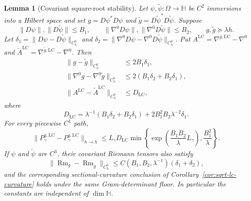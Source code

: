 \documentclass[11pt]{article}
\newtheorem{lemma}[theorem]{Lemma}
\theoremstyle{definition}
\theoremstyle{remark}
\newcommand{\LC}{\mathrm{LC}}
\begin{document}
\begin{lemma}[Covariant square-root stability]\label{lem:manifold-sqrt-stability}
Let $\psi,\widetilde\psi:\Omega\to\mathbb H$ be $C^2$ immersions into a
Hilbert space and set $g=D\psi^*D\psi$ and
$\widetilde g=D\widetilde\psi^*D\widetilde\psi$. Suppose
\begin{equation}
  \|D\psi\|,\|D\widetilde\psi\|\le B_1,\qquad
  \|\nabla^0D\psi\|,\|\nabla^0D\widetilde\psi\|\le B_2,\qquad
  g,\widetilde g\succeq\lambda h.
\end{equation}
Let $\delta_1=\|D\psi-D\widetilde\psi\|_{C^0_h}$ and
$\delta_2=\|\nabla^0D\psi-\nabla^0D\widetilde\psi\|_{C^0_h}$. Put
$A^\LC=\nabla^{g,\LC}-\nabla^0$ and
$\widetilde A^\LC=\nabla^{\widetilde g,\LC}-\nabla^0$. Then
\begin{align}
  \|g-\widetilde g\|_{C^0_h}
  &\le2B_1\delta_1,\\
  \|\nabla^0g-\nabla^0\widetilde g\|_{C^0_h}
  &\le2(B_1\delta_2+B_2\delta_1),\\
  \|A^\LC-\widetilde A^\LC\|_{C^0_h}
  &\le D_{\LC},
\end{align}
where
\begin{equation}
  D_{\LC}=\lambda^{-1}(B_1\delta_2+B_2\delta_1)
       +2B_1^2B_2\lambda^{-2}\delta_1.
\end{equation}
For every piecewise $C^1$ path,
\begin{equation}
  \|P_\gamma^{g,\LC}-P_\gamma^{\widetilde g,\LC}\|_{h\to h}
  \le L_\gamma D_{\LC}
  \min\left\{
    \exp\left(\frac{B_1B_2}{\lambda}L_\gamma\right),
    \frac{B_1^2}{\lambda}
  \right\}.
\end{equation}
If $\psi$ and $\widetilde\psi$ are $C^3$, their covariant Riemann tensors also
satisfy
\begin{equation}
  \|\operatorname{Rm}_g-\operatorname{Rm}_{\widetilde g}\|_{C^0_h}
  \le C(B_1,B_2,\lambda^{-1})(\delta_1+\delta_2),
\end{equation}
and the corresponding sectional-curvature conclusion of
Corollary~\ref{cor:sqrt-lc-curvature} holds under the same Gram-determinant
floor.
In particular the constants are independent of $\dim\mathbb H$.
\end{lemma}
\end{document}
